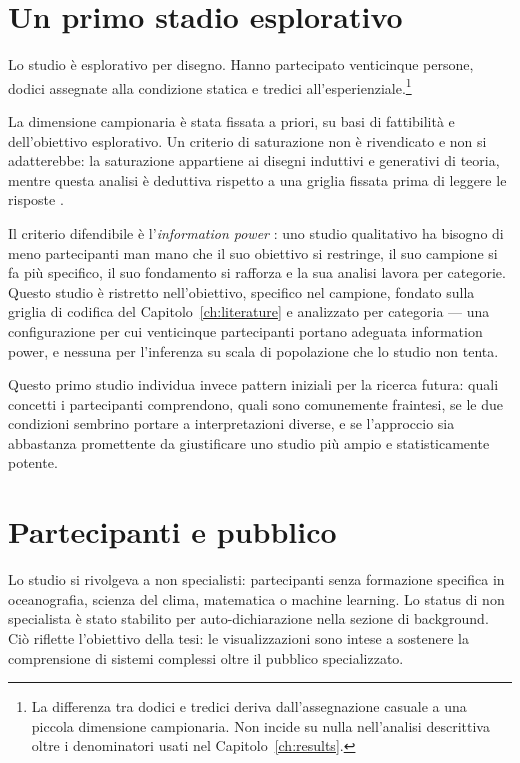 \section{Un primo stadio esplorativo}
\label{sec:eval-exploratory}

Lo studio è esplorativo per disegno. Hanno partecipato venticinque persone, dodici assegnate alla condizione statica e tredici all'esperienziale.\footnote{La differenza tra dodici e tredici deriva dall'assegnazione casuale a una piccola dimensione campionaria. Non incide su nulla nell'analisi descrittiva oltre i denominatori usati nel Capitolo~\ref{ch:results}.}

La dimensione campionaria è stata fissata a priori, su basi di fattibilità e dell'obiettivo esplorativo. Un criterio di saturazione non è rivendicato e non si adatterebbe: la saturazione appartiene ai disegni induttivi e generativi di teoria, mentre questa analisi è deduttiva rispetto a una griglia fissata prima di leggere le risposte \citep{braunclarke2021}.

Il criterio difendibile è l'\emph{information power} \citep{malterud2016}: uno studio qualitativo ha bisogno di meno partecipanti man mano che il suo obiettivo si restringe, il suo campione si fa più specifico, il suo fondamento si rafforza e la sua analisi lavora per categorie. Questo studio è ristretto nell'obiettivo, specifico nel campione, fondato sulla griglia di codifica del Capitolo~\ref{ch:literature} e analizzato per categoria --- una configurazione per cui venticinque partecipanti portano adeguata information power, e nessuna per l'inferenza su scala di popolazione che lo studio non tenta.

Questo primo studio individua invece pattern iniziali per la ricerca futura: quali concetti i partecipanti comprendono, quali sono comunemente fraintesi, se le due condizioni sembrino portare a interpretazioni diverse, e se l'approccio sia abbastanza promettente da giustificare uno studio più ampio e statisticamente potente.

\section{Partecipanti e pubblico}
\label{sec:eval-audience}

Lo studio si rivolgeva a non specialisti: partecipanti senza formazione specifica in oceanografia, scienza del clima, matematica o machine learning. Lo status di non specialista è stato stabilito per auto-dichiarazione nella sezione di background. Ciò riflette l'obiettivo della tesi: le visualizzazioni sono intese a sostenere la comprensione di sistemi complessi oltre il pubblico specializzato.

